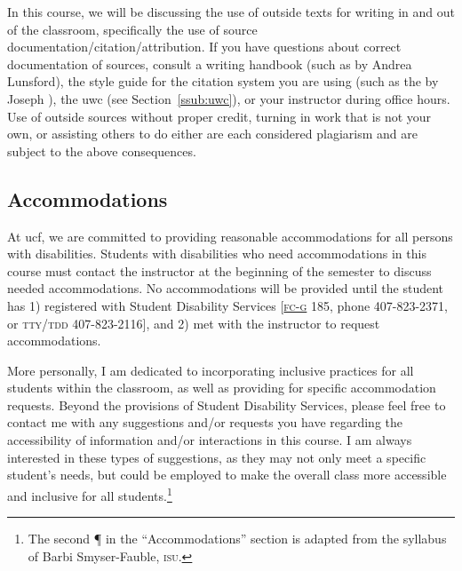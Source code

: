 \documentclass[11pt, twosides]{amsart}	%
\begin{document}
In this course, we will be discussing the use of outside texts for writing in and out of the classroom, specifically the use of source documentation/citation/attribution. If you have questions about correct documentation of sources, consult a writing handbook (such as  by Andrea Lunsford), the style guide for the citation system you are using (such as the  by Joseph \citeauthor{gibaldi:2009aa}), the \ac{uwc} (see Section~\ref{ssub:uwc}), or your instructor during office hours. Use of outside sources without proper credit, turning in work that is not your own, or assisting others to do either are each considered plagiarism and are subject to the above consequences.

\subsection{Accommodations}
At \ac{ucf}, we are committed to providing reasonable accommodations for all persons with disabilities. Students with disabilities who need accommodations in this course must contact the instructor at the beginning of the semester to discuss needed accommodations. No accommodations will be provided until the student has 1) registered with Student Disability Services [\href{http://map.ucf.edu/locations/7g/ferrell-commons-g-fc-g/}{\textsc{fc-g}} 185, phone 407-823-2371, or \textsc{tty/tdd} 407-823-2116], and 2) met with the instructor to request accommodations.

More personally, I am dedicated to incorporating inclusive practices for all students within the classroom, as well as providing for specific accommodation requests. Beyond the provisions of Student Disability Services, please feel free to contact me with any suggestions and/or requests you have regarding the accessibility of information and/or interactions in this course. I am always interested in these types of suggestions, as they may not only meet a specific student's needs, but could be employed to make the overall class more accessible and inclusive for all students.\footnote{The second ¶ in the ``Accommodations'' section is adapted from the syllabus of Barbi Smyser-Fauble, \textsc{isu}.}
\end{document}
